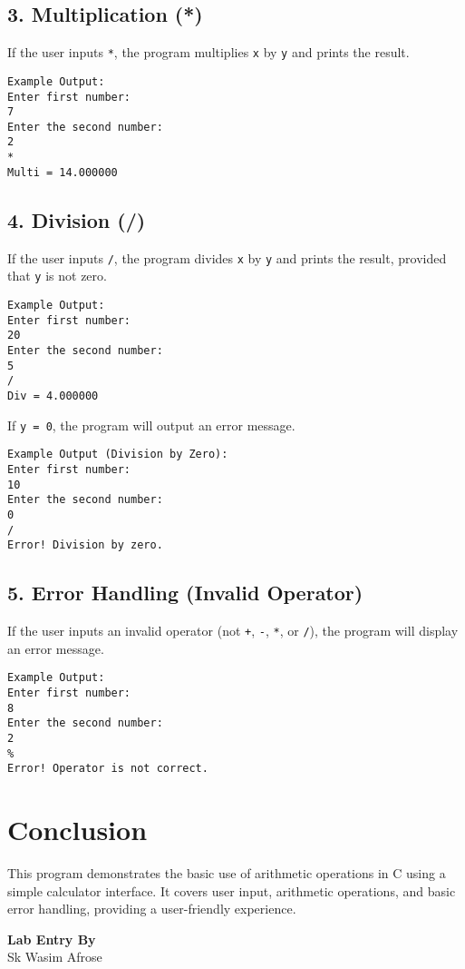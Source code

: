\documentclass[a4paper,14pt]{article}
\begin{document}
\subsection*{3. Multiplication (*)}
If the user inputs \texttt{*}, the program multiplies \texttt{x} by \texttt{y} and prints the result.
\begin{verbatim}
Example Output:
Enter first number: 
7 
Enter the second number: 
2 
* 
Multi = 14.000000
\end{verbatim}

\subsection*{4. Division (/)}
If the user inputs \texttt{/}, the program divides \texttt{x} by \texttt{y} and prints the result, provided that \texttt{y} is not zero.
\begin{verbatim}
Example Output:
Enter first number: 
20 
Enter the second number: 
5 
/ 
Div = 4.000000
\end{verbatim}

If \texttt{y = 0}, the program will output an error message.
\begin{verbatim}
Example Output (Division by Zero):
Enter first number: 
10 
Enter the second number: 
0 
/ 
Error! Division by zero.
\end{verbatim}

\subsection*{5. Error Handling (Invalid Operator)}
If the user inputs an invalid operator (not \texttt{+}, \texttt{-}, \texttt{*}, or \texttt{/}), the program will display an error message.
\begin{verbatim}
Example Output:
Enter first number: 
8 
Enter the second number: 
2 
% 
Error! Operator is not correct.
\end{verbatim}

\section*{Conclusion}
This program demonstrates the basic use of arithmetic operations in C using a simple calculator interface. It covers user input, arithmetic operations, and basic error handling, providing a user-friendly experience.

\vspace{250pt}
\begin{center}
\textbf{Lab Entry By}\\
Sk Wasim Afrose
\end{center}
\end{document}
